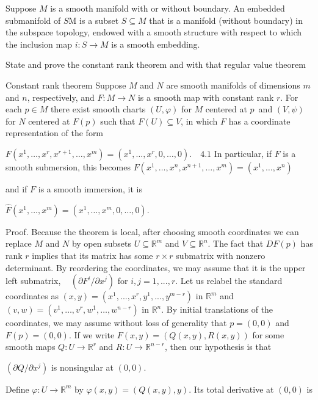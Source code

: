 Suppose \( M \) is a smooth manifold with or without boundary. 
An embedded submanifold of \( S \)M is a subset \( S \subseteq M \) that is a manifold (without boundary) 
in the subspace topology, endowed with a smooth structure with respect to which the inclusion map
\( i : S \to M \) is a smooth embedding.


State and prove the constant rank theorem and with that regular value theorem

Constant rank theorem
Suppose \( M \) and \( N \) are smooth manifolds of dimensions \( m \) and \( n \), respectively, and \( F:M\rightarrow N \) is a smooth map with constant rank \( r \). 
For each \( p\in M \) there exist smooth charts \((U, \varphi)\) for \( M \) centered at \( p \) and \((V, \psi)\) for \( N \) centered at \( F(p) \) such that \( F(U)\subseteq V \), in which \( F \) has a coordinate representation of the form 

\(F(x^{1},\dots,x^{r},x^{r+1},\dots,x^{m})=(x^{1},\dots,x^{r},0,\dots,0).\quad \text{4.1}\)
In particular, if \( F \) is a smooth submersion, this becomes 
\( F(x^{1},\dots,x^{n},x^{n+1},\dots,x^{m})=(x^{1},\dots,x^{n}) \)

and if \(F\) is a smooth immersion, it is 

\(\hat{F}(x^{1},\dots,x^{m})=(x^{1},\dots,x^{m},0,\dots,0).\)

Proof. Because the theorem is local, after choosing smooth coordinates we can replace \( M \) and \( N \) by open subsets \( U\subseteq\mathbb{R}^{m} \) and \(V\subseteq\mathbb{R}^{n}\). The fact that \(DF(p)\) has rank \(r\) implies that its matrix has some \(r\times r\) submatrix with nonzero determinant. 
By reordering the coordinates, we may assume that it is the upper left submatrix,   
\((\partial F^i / \partial x^j)\) for \(i,j=1,...,r\). Let us relabel the standard coordinates as \((x,y)= (x^{1},...,x^{r},y^{1},...,y^{m-r})\) in \(\mathbb{R}^{m}\) and 
\((v,w)=(v^{1},\dots,v^{r},w^{1},\dots,w^{n-r})\) in \(\mathbb{R}^{n}\). By initial translations of the coordinates, we may assume without loss of generality that \(p=(0,0)\) and \(F(p)=(0,0)\). If we write \(F(x,y)=(Q(x,y),R(x,y))\) for some smooth maps \(Q:U\rightarrow\mathbb{R}^{r}\) and \(R: U\rightarrow\mathbb{R}^{n-r}\), then our hypothesis is that   

\((\partial Q / \partial x^j)\) is nonsingular at \((0,0)\). 

Define \(\varphi: U \rightarrow \mathbb{R}^m\) by \(\varphi(x,y)=(Q(x,y),y)\). Its total derivative at \((0,0)\) is 

